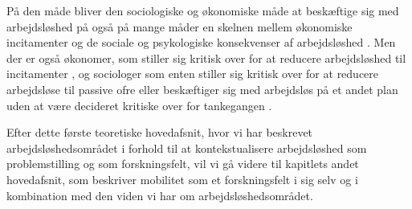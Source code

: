 På den måde bliver den sociologiske og økonomiske måde at beskæftige sig med arbejdsløshed på også på mange måder en skelnen mellem økonomiske incitamenter \parencite{Mankiw2011, Cahuc2004, Mankiw2007, McCall1970, Mortensen1970, Baily1978} og de sociale og psykologiske konsekvenser af arbejdsløshed \parencite{Jahoda1971, Eisenberg1938}. Men der er også økonomer, som stiller sig kritisk over for at reducere arbejdsløshed til incitamenter \parencite{Atkinson1991}, og sociologer som enten stiller sig kritisk over for at reducere arbejdsløse til passive ofre \parencite{Ezzy1993, Halvorsen1999} eller beskæftiger sig med arbejdsløs på et andet plan uden at være decideret kritiske over for tankegangen \parencite{Larsen2009}.

Efter dette første teoretiske hovedafsnit, hvor vi har beskrevet arbejdsløshedsområdet i forhold til at kontekstualisere arbejdsløshed som problemstilling og som forskningsfelt, vil vi gå videre til kapitlets andet hovedafsnit, som beskriver mobilitet som et forskningsfelt i sig selv og i kombination med den viden vi har om arbejdsløshedsområdet.




